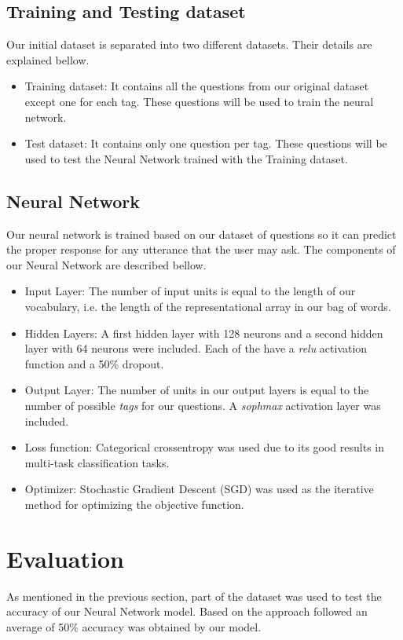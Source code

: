 \documentclass[]{article}
\begin{document}
\subsection{Training and Testing dataset}
Our initial dataset is separated into two different datasets. Their details are explained bellow.

\begin{itemize}
  \item{Training dataset:} It contains all the questions from our original dataset except one for each tag. These questions will be used to train the neural network.
  \item{Test dataset:} It contains only one question per tag. These questions will be used to test the Neural Network trained with the Training dataset.
\end{itemize}

\subsection{Neural Network}
Our neural network is trained based on our dataset of questions so it can predict the proper response for any utterance that the user may ask. The components of our Neural Network are described bellow.

\begin{itemize}
  \item{Input Layer:} The number of input units is equal to the length of our vocabulary, i.e. the length of the representational array in our bag of words.
  \item{Hidden Layers:} A first hidden layer with 128 neurons and a second hidden layer with 64 neurons were included. Each of the have a \emph{relu} activation function and a 50\% dropout.
  \item{Output Layer:} The number of units in our output layers is equal to the number of possible \emph{tags} for our questions. A \emph{sophmax} activation layer was included.
  \item{Loss function:} Categorical crossentropy was used due to its good results in multi-task classification tasks.
  \item{Optimizer:} Stochastic Gradient Descent (SGD) was used as the iterative method for optimizing the objective function.
\end{itemize}

\section{Evaluation}
As mentioned in the previous section, part of the dataset was used to test the accuracy of our Neural Network model. Based on the approach followed an average of 50\% accuracy was obtained by our model.
\end{document}
